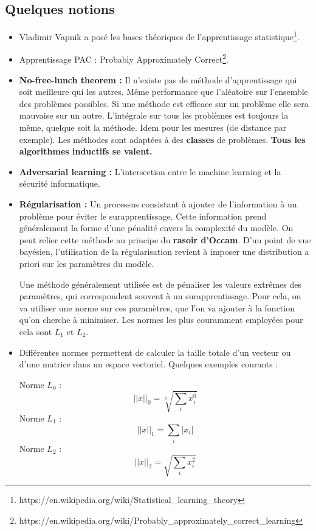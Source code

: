 \documentclass{article}
\begin{document}
\subsection{Quelques notions}
\begin{itemize}
\item Vladimir Vapnik a posé les bases théoriques de l'apprentissage statistique\footnote{https://en.wikipedia.org/wiki/Statistical\_learning\_theory}.
\item Apprentissage PAC : Probably Approximately Correct\footnote{https://en.wikipedia.org/wiki/Probably\_approximately\_correct\_learning}.
\item \textbf{No-free-lunch theorem :} Il n'existe pas de méthode d'apprentissage qui soit meilleure qui les autres. Même performance que l'aléatoire sur l'ensemble des problèmes possibles. Si une méthode est efficace sur un problème elle sera mauvaise sur un autre. L'intégrale sur tous les problèmes est toujours la même, quelque soit la méthode. Idem pour les mesures (de distance par exemple). Les méthodes sont adaptées à des \textbf{classes} de problèmes. \textbf{Tous les algorithmes inductifs se valent.}
\item \textbf{Adversarial learning :} L'intersection entre le machine learning et la sécurité informatique.
\item \textbf{Régularisation :} Un processus consistant à ajouter de l'information à un problème pour éviter le surapprentissage. Cette information prend généralement la forme d'une pénalité envers la complexité du modèle. On peut relier cette méthode au principe du \textbf{rasoir d'Occam}. D'un point de vue bayésien, l'utilisation de la régularisation revient à imposer une distribution a priori sur les paramètres du modèle.

Une méthode généralement utilisée est de pénaliser les valeurs extrêmes des paramètres, qui correspondent souvent à un surapprentissage. Pour cela, on va utiliser une norme sur ces paramètres, que l'on va ajouter à la fonction qu'on cherche à minimiser. Les normes les plus couramment employées pour cela sont $L_1$ et $L_2$.

\item Différentes normes permettent de calculer la taille totale d'un vecteur ou d'une matrice dans un espace vectoriel. Quelques exemples courants : 

      Norme $L_0$ :
            \[ ||x||_0 = \sqrt[0]{\sum_i x_i^0} \]
      Norme $L_1$ :
            \[ ||x||_1 = \sum_i |x_i| \]
      Norme $L_2$ :
            \[ ||x||_2 = \sqrt{\sum_i x^2_i} \]
            

\end{itemize}
\end{document}
